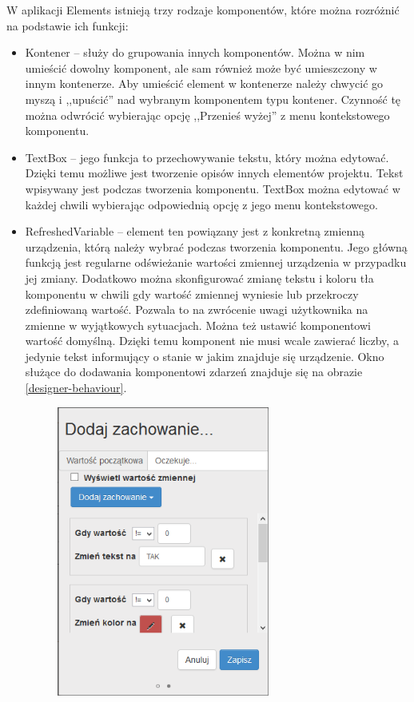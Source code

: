W aplikacji Elements istnieją trzy rodzaje komponentów, które można rozróżnić na podstawie ich funkcji:
\begin{itemize}
	\item Kontener – służy do grupowania innych komponentów. Można w nim umieścić dowolny komponent, ale sam również może być umieszczony w innym kontenerze. Aby umieścić element w kontenerze należy chwycić go myszą i ,,upuścić'' nad wybranym komponentem typu kontener. Czynność tę można odwrócić wybierając opcję ,,Przenieś wyżej'' z menu kontekstowego komponentu.
	\item TextBox – jego funkcja to przechowywanie tekstu, który można edytować. Dzięki temu możliwe jest tworzenie opisów innych elementów projektu. Tekst wpisywany jest podczas tworzenia komponentu. TextBox można edytować w każdej chwili wybierając odpowiednią opcję z jego menu kontekstowego.
	\item RefreshedVariable – element ten powiązany jest z konkretną zmienną urządzenia, którą należy wybrać podczas tworzenia komponentu. Jego główną funkcją jest regularne odświeżanie wartości zmiennej urządzenia w przypadku jej zmiany. Dodatkowo można skonfigurować zmianę tekstu i koloru tła komponentu w chwili gdy wartość zmiennej wyniesie lub przekroczy zdefiniowaną wartość. Pozwala to na zwrócenie uwagi użytkownika na zmienne w wyjątkowych sytuacjach. Można też ustawić komponentowi wartość domyślną. Dzięki temu komponent nie musi wcale zawierać liczby, a jedynie tekst informujący o stanie w jakim znajduje się urządzenie. Okno służące do dodawania komponentowi zdarzeń znajduje się na obrazie \ref{designer-behaviour}. 
	\begin{figure}[h]
	\centerline{
		\includegraphics[width=70mm]{./img/screen/designer_zmiennazachowanie.png}
}
\end{figure}
\end{itemize}
